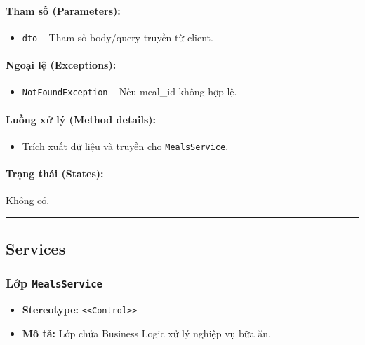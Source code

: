 \documentclass[12pt,a4paper]{article}
\begin{document}
\paragraph{Tham số (Parameters):}
\begin{itemize}[leftmargin=*]
    \item \texttt{dto} – Tham số body/query truyền từ client.
\end{itemize}


\paragraph{Ngoại lệ (Exceptions):}
\begin{itemize}[leftmargin=*]
    \item \texttt{NotFoundException} – Nếu meal\_id không hợp lệ.
\end{itemize}


\paragraph{Luồng xử lý (Method details):}
\begin{itemize}[leftmargin=*]
    \item Trích xuất dữ liệu và truyền cho \texttt{MealsService}.
\end{itemize}


\paragraph{Trạng thái (States):}
Không có.

\vskip 0.5cm
\noindent\rule{\textwidth}{0.5pt}
\vskip 0.5cm

\subsection{Services}


\subsubsection{Lớp \texttt{MealsService}}

\begin{itemize}[leftmargin=*]
    \item \textbf{Stereotype:} \texttt{\textless{}\textless{}Control\textgreater{}\textgreater{}}
    \item \textbf{Mô tả:} Lớp chứa Business Logic xử lý nghiệp vụ bữa ăn.
\end{itemize}
\end{document}
